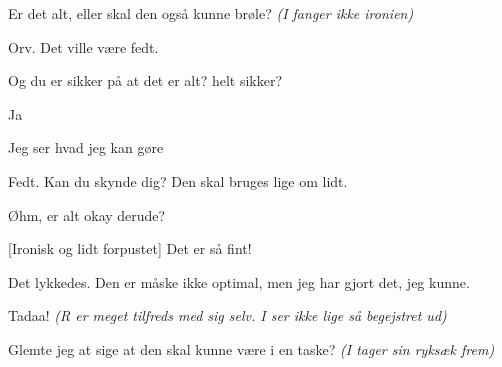 \documentclass[a4paper,11pt]{article}
\begin{document}
\begin{sketch}
 Er det alt, eller skal den også kunne brøle? \emph{(I fanger ikke ironien)}

 Orv. Det ville være fedt. 

 Og du er sikker på at det er alt? helt sikker?

 Ja

 Jeg ser hvad jeg kan gøre 

 Fedt. Kan du skynde dig? Den skal bruges lige om lidt. 


 Øhm, er alt okay derude? 


[Ironisk og lidt forpustet] Det er så fint!


 Det lykkedes. Den er måske ikke optimal, men jeg har gjort det, jeg kunne. 


 Tadaa! \emph{(R er meget tilfreds med sig selv. I ser ikke lige så begejstret ud)}

 Glemte jeg at sige at den skal kunne være i en taske? \emph{(I tager sin ryksæk frem)}

\end{sketch}
\end{document}
